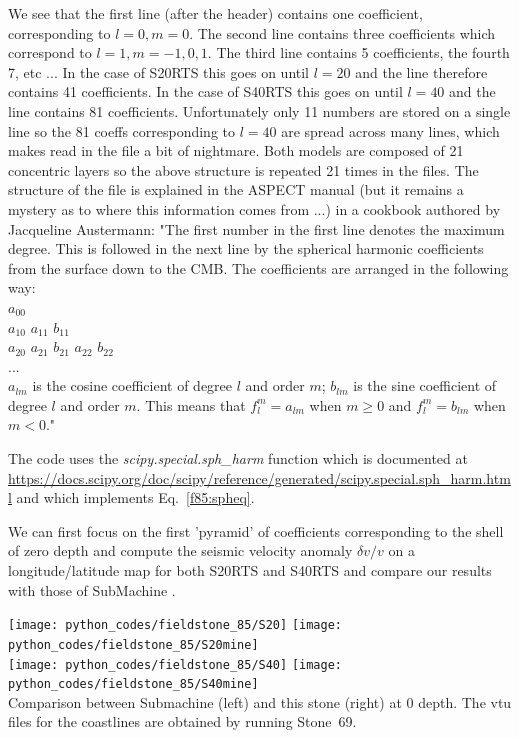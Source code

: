 We see that the first line (after the header) contains one coefficient, corresponding to ${l=0},{m=0}$. 
The second line contains three coefficients which correspond to ${l=1},{m=-1,0,1}$. The third line contains 5 
coefficients, the fourth 7, etc ... 
In the case of S20RTS this goes on until $l=20$ and the line therefore contains 41 coefficients.
In the case of S40RTS this goes on until $l=40$ and the line contains 81 coefficients.
Unfortunately only 11 numbers are stored on a single line so the 81 coeffs corresponding to $l=40$ 
are spread across many lines, which makes read in the file a bit of nightmare. 
Both models are composed of 21 concentric layers so the above structure is repeated 21 times in the files. 
The structure of the file is explained in the ASPECT manual (but it remains a mystery as to where this information comes from ...) in a cookbook authored by Jacqueline Austermann:  
"The first number in the first line denotes the maximum degree. This is followed in
the next line by the spherical harmonic coefficients from the surface down to the
CMB. The coefficients are arranged in the following way:\\

\noindent $a_{00}$ \\
$a_{10}$ $a_{11}$ $b_{11}$ \\
$a_{20}$ $a_{21}$ $b_{21}$ $a_{22}$ $b_{22}$ \\
... \\

$a_{lm}$ is the cosine coefficient of degree $l$ and order $m$; $b_{lm}$ is
the sine coefficient of degree $l$ and order $m$. 
This means that $f_l^m=a_{lm}$ when $m\ge 0$ and $f_l^m=b_{lm}$ when $m<0$."

The code uses the {\sl scipy.special.sph\_harm} function which is documented 
at \url{https://docs.scipy.org/doc/scipy/reference/generated/scipy.special.sph_harm.html}
and which implements Eq.~\eqref{f85:spheq}.

We can first focus on the first 'pyramid' of coefficients corresponding to the shell 
of zero depth and compute the seismic velocity anomaly $\delta v/v$ on a longitude/latitude
map for both S20RTS and S40RTS and compare our results with those of SubMachine \cite{homs18}.

\begin{center}
\texttt{[image: python\_codes/fieldstone\_85/S20]}
\texttt{[image: python\_codes/fieldstone\_85/S20mine]}\\
\texttt{[image: python\_codes/fieldstone\_85/S40]}
\texttt{[image: python\_codes/fieldstone\_85/S40mine]}\\
{\captionfont Comparison between Submachine (left) and this stone (right) at 0 depth.
The vtu files for the coastlines are obtained by running Stone~69.}
\end{center}

